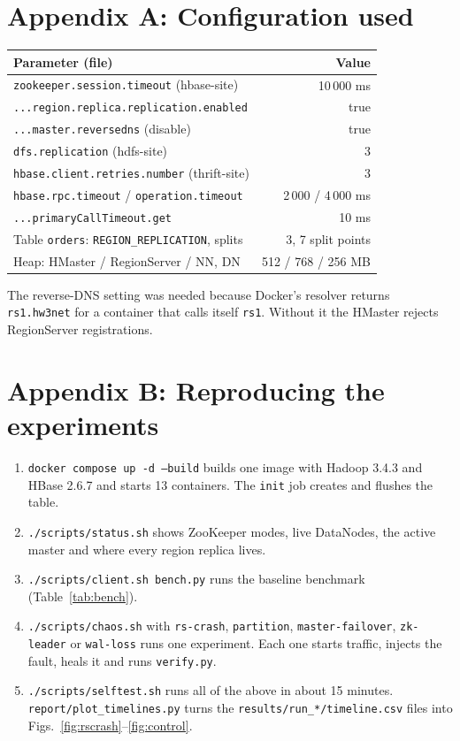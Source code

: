 \documentclass[10pt,twocolumn,letterpaper]{article}
\newcommand{\code}[1]{\texttt{\small #1}}
\begin{document}
\section*{Appendix A: Configuration used}
\begin{table}[H]
\footnotesize
\begin{tabularx}{\columnwidth}{@{}Xr@{}}
\toprule
Parameter (file) & Value \\
\midrule
\code{zookeeper.session.timeout} (hbase-site) & 10\,000 ms \\
\code{...region.replica.replication.enabled} & true \\
\code{...master.reversedns} (disable) & true \\
\code{dfs.replication} (hdfs-site) & 3 \\
\code{hbase.client.retries.number} (thrift-site) & 3 \\
\code{hbase.rpc.timeout} / \code{operation.timeout} & 2\,000 / 4\,000 ms \\
\code{...primaryCallTimeout.get} & 10 ms \\
Table \code{orders}: \code{REGION\_REPLICATION}, splits & 3, 7 split points \\
Heap: HMaster / RegionServer / NN, DN & 512 / 768 / 256 MB \\
\bottomrule
\end{tabularx}
\end{table}
The reverse-DNS setting was needed because Docker's resolver returns \code{rs1.hw3net} for a container that calls itself \code{rs1}. Without it the HMaster rejects RegionServer registrations.

\section*{Appendix B: Reproducing the experiments}
\begin{enumerate}
\item \code{docker compose up -d --build} builds one image with Hadoop 3.4.3 and HBase 2.6.7 and starts 13 containers. The \code{init} job creates and flushes the table.
\item \code{./scripts/status.sh} shows ZooKeeper modes, live DataNodes, the active master and where every region replica lives.
\item \code{./scripts/client.sh bench.py} runs the baseline benchmark (Table~\ref{tab:bench}).
\item \code{./scripts/chaos.sh} with \code{rs-crash}, \code{partition}, \code{master-failover}, \code{zk-leader} or \code{wal-loss} runs one experiment. Each one starts traffic, injects the fault, heals it and runs \code{verify.py}.
\item \code{./scripts/selftest.sh} runs all of the above in about 15 minutes. \code{report/plot\_timelines.py} turns the \code{results/run\_*/timeline.csv} files into Figs.~\ref{fig:rscrash}--\ref{fig:control}.
\end{enumerate}
\end{document}
